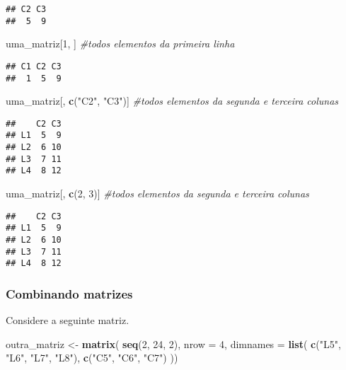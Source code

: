 \documentclass[]{book}
\newenvironment{Shaded}{\begin{snugshade}}{\end{snugshade}}
\newcommand{\CommentTok}[1]{\textcolor[rgb]{0.56,0.35,0.01}{\textit{#1}}}
\newcommand{\DataTypeTok}[1]{\textcolor[rgb]{0.13,0.29,0.53}{#1}}
\newcommand{\DecValTok}[1]{\textcolor[rgb]{0.00,0.00,0.81}{#1}}
\newcommand{\KeywordTok}[1]{\textcolor[rgb]{0.13,0.29,0.53}{\textbf{#1}}}
\newcommand{\NormalTok}[1]{#1}
\newcommand{\StringTok}[1]{\textcolor[rgb]{0.31,0.60,0.02}{#1}}
\theoremstyle{definition}
\theoremstyle{definition}
\theoremstyle{definition}
\theoremstyle{remark}
\begin{document}
\begin{verbatim}
## C2 C3 
##  5  9
\end{verbatim}

\begin{Shaded}
\begin{Highlighting}[]
\NormalTok{uma_matriz[}\DecValTok{1}\NormalTok{, ] }\CommentTok{#todos elementos da primeira linha}
\end{Highlighting}
\end{Shaded}

\begin{verbatim}
## C1 C2 C3 
##  1  5  9
\end{verbatim}

\begin{Shaded}
\begin{Highlighting}[]
\NormalTok{uma_matriz[, }\KeywordTok{c}\NormalTok{(}\StringTok{"C2"}\NormalTok{, }\StringTok{"C3"}\NormalTok{)] }\CommentTok{#todos elementos da segunda e terceira colunas}
\end{Highlighting}
\end{Shaded}

\begin{verbatim}
##    C2 C3
## L1  5  9
## L2  6 10
## L3  7 11
## L4  8 12
\end{verbatim}

\begin{Shaded}
\begin{Highlighting}[]
\NormalTok{uma_matriz[, }\KeywordTok{c}\NormalTok{(}\DecValTok{2}\NormalTok{, }\DecValTok{3}\NormalTok{)] }\CommentTok{#todos elementos da segunda e terceira colunas}
\end{Highlighting}
\end{Shaded}

\begin{verbatim}
##    C2 C3
## L1  5  9
## L2  6 10
## L3  7 11
## L4  8 12
\end{verbatim}

\hypertarget{combinando-matrizes}{%
\subsubsection{Combinando matrizes}\label{combinando-matrizes}}

Considere a seguinte matriz.

\begin{Shaded}
\begin{Highlighting}[]
\NormalTok{outra_matriz <-}\StringTok{ }\KeywordTok{matrix}\NormalTok{(}
      \KeywordTok{seq}\NormalTok{(}\DecValTok{2}\NormalTok{, }\DecValTok{24}\NormalTok{, }\DecValTok{2}\NormalTok{),}
      \DataTypeTok{nrow =} \DecValTok{4}\NormalTok{,}
      \DataTypeTok{dimnames =} \KeywordTok{list}\NormalTok{(}
        \KeywordTok{c}\NormalTok{(}\StringTok{"L5"}\NormalTok{, }\StringTok{"L6"}\NormalTok{, }\StringTok{"L7"}\NormalTok{, }\StringTok{"L8"}\NormalTok{),}
        \KeywordTok{c}\NormalTok{(}\StringTok{"C5"}\NormalTok{, }\StringTok{"C6"}\NormalTok{, }\StringTok{"C7"}\NormalTok{)}
\NormalTok{      ))}
\end{Highlighting}
\end{Shaded}
\end{document}
